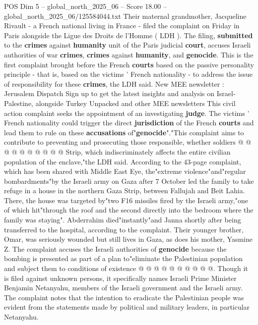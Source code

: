 \begin{textsample}{POS Dim 5 – global\_north\_2025\_06 – Score 18.00 – global\_north\_2025\_06/125584044.txt}  \label{ex:f5_pos_081}
Their maternal grandmother, Jacqueline Rivault - a French national living in France - filed the complaint on Friday in Paris alongside the Ligue des Droits de l'Homme ( LDH ).
The filing, \textbf{submitted} to the \textbf{crimes} against \textbf{humanity} unit of the Paris judicial \textbf{court}, accuses Israeli authorities of war \textbf{crimes}, \textbf{crimes} against \textbf{humanity}, and \textbf{genocide}.
This is the first complaint brought before the French \textbf{courts} based on the passive personality principle - that is, based on the victims ' French nationality - to address the issue of responsibility for these \textbf{crimes}, the LDH said.
New MEE newsletter : Jerusalem Dispatch Sign up to get the latest insights and analysis on Israel-Palestine, alongside Turkey Unpacked and other MEE newsletters This civil action complaint seeks the appointment of an investigating \textbf{judge}.
The victims ' French nationality could trigger the direct \textbf{jurisdiction} of the French \textbf{courts} and lead them to rule on these \textbf{accusations} of"\textbf{genocide}"."This complaint aims to contribute to preventing and prosecuting those responsible, whether soldiers @ @ @ @ @ @ @ @ @ @ Strip, which indiscriminately affects the entire civilian population of the enclave,"the LDH said.
According to the 43-page complaint, which has been shared with Middle East Eye, the"extreme violence"and"regular bombardments"by the Israeli army on Gaza after 7 October led the family to take refuge in a house in the northern Gaza Strip, between Fallujah and Beit Lahia.
There, the house was targeted by"two F16 missiles fired by the Israeli army,"one of which hit"through the roof and the second directly into the bedroom where the family was staying".
Abderrahim died"instantly"and Janna shortly after being transferred to the hospital, according to the complaint.
Their younger brother, Omar, was seriously wounded but still lives in Gaza, as does his mother, Yasmine Z.
The complaint accuses the Israeli authorities of \textbf{genocide} because the bombing is presented as part of a plan to"eliminate the Palestinian population and subject them to conditions of existence @ @ @ @ @ @ @ @ @ @.
Though it is filed against unknown persons, it specifically names Israeli Prime Minister Benjamin Netanyahu, members of the Israeli government and the Israeli army.
The complaint notes that the intention to eradicate the Palestinian people was evident from the statements made by political and military leaders, in particular Netanyahu.

\end{textsample}

